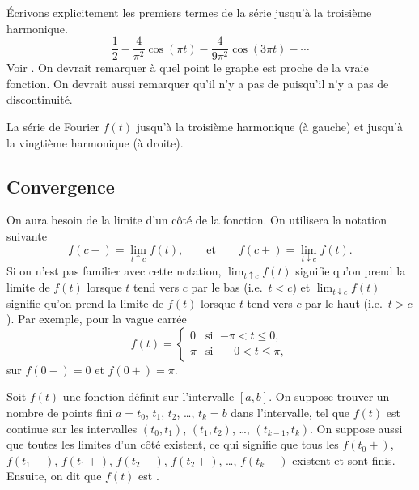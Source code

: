 \begin{example}
Écrivons explicitement les premiers termes de la série jusqu'à la troisième harmonique.
\begin{equation*}
\frac{1}{2} -
\frac{4}{\pi^2} \cos (\pi t)
-
\frac{4}{9 \pi^2} \cos (3 \pi t)
- \cdots
\end{equation*}
Voir .  On devrait remarquer à quel point le graphe est proche de la vraie fonction. On devrait aussi remarquer qu'il n'y a pas de 
 puisqu'il n'y a pas de discontinuité.

\begin{myfig}
\capstart
\caption{La série de Fourier $f(t)$ jusqu'à la troisième harmonique (à gauche)
et jusqu'à la vingtième harmonique (à droite).\label{gfs:sawcontfsfig}}
\end{myfig}
\end{example}

\subsection{Convergence}

On aura besoin de la limite d'un côté de la fonction. On utilisera la notation suivante 
\begin{equation*}
f(c-) = \lim_{t \uparrow c} f(t),
\qquad \text{et} \qquad
f(c+) = \lim_{t \downarrow c} f(t).
\end{equation*}
Si on n'est pas familier avec cette notation, 
$\lim_{t \uparrow c} f(t)$ signifie qu'on prend la limite de $f(t)$
lorsque $t$ tend vers $c$ par le bas (i.e.\ $t < c$) et
$\lim_{t \downarrow c} f(t)$ signifie qu'on prend la limite de $f(t)$
lorsque $t$ tend vers $c$ par le haut (i.e.\ $t > c$).
Par exemple, pour la vague carrée 
\begin{equation} \label{gfs:sqwaveeq}
f(t) =
\begin{cases}
0 & \text{si } \; {-\pi} < t \leq 0 , \\
\pi & \text{si } \; \phantom{-}0 < t \leq \pi ,
\end{cases}
\end{equation}
sur $f(0-) = 0$ et $f(0+) = \pi$.

Soit $f(t)$ une fonction définit sur l'intervalle $[a,b]$.  On suppose trouver un nombre de points fini 
$a=t_0$, $t_1$, $t_2$, \ldots, $t_k=b$ dans l'intervalle, tel que  $f(t)$ est continue sur les intervalles
  $(t_0,t_1)$, 
$(t_1,t_2)$, \ldots, 
$(t_{k-1},t_k)$.
On suppose aussi que toutes les limites d'un côté existent, ce qui signifie que tous les 
$f(t_0+)$,
$f(t_1-)$,
$f(t_1+)$,
$f(t_2-)$,
$f(t_2+)$,
\ldots,
$f(t_k-)$
existent et sont finis.
Ensuite, on dit que $f(t)$ est \emph{}.

